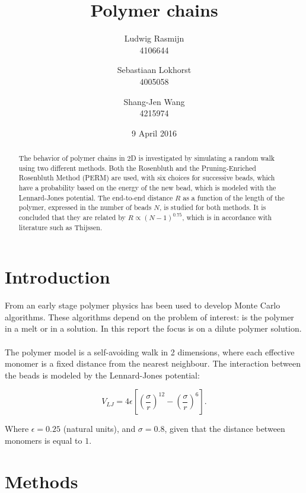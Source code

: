 \documentclass[a4paper,twocolumn]{article}
\begin{document}
\title{Polymer chains}
\date{9 April 2016}
\author{Ludwig Rasmijn\\ 4106644 \and Sebastiaan Lokhorst\\ 4005058 \and Shang-Jen Wang\\ 4215974}
\maketitle

\begin{abstract}
	The behavior of polymer chains in 2D is investigated by simulating a random walk using two different methods.
	Both the Rosenbluth and the Pruning-Enriched Rosenbluth Method (PERM) are used, with six choices for successive beads, which have a probability based on the energy of the new bead, which is modeled with the Lennard-Jones potential.
	The end-to-end distance $R$ as a function of the length of the polymer, expressed in the number of beads $N$, is studied for both methods. It is concluded that they are related by $R \propto (N-1)^{0.75}$, which is in accordance with literature such as Thijssen\cite{thijssen}.
\end{abstract}

\section{Introduction}
From an early stage polymer physics has been used to develop Monte Carlo algorithms. These algorithms depend on the problem of interest: is the polymer in a melt or in a solution. In this report the focus is on a dilute polymer solution.\\ \\ 
The polymer model is a self-avoiding walk in 2 dimensions, where each effective monomer is a fixed distance from the nearest neighbour. The interaction between the beads is modeled by the Lennard-Jones potential:

\begin{equation}\label{eq:lennardjones}
	V_{LJ}=4\epsilon \left[ \left( \frac{\sigma}{r} \right)^{12} - \left( \frac{\sigma}{r} \right)^{6} \right]\text{.}
\end{equation}

Where $\epsilon = 0.25$ (natural units), and $\sigma = 0.8$, given that the distance between monomers is equal to $1$.
\section{Methods}
\end{document}
